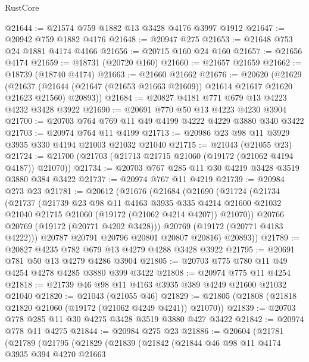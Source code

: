 \begin{lexlean}{RustCore}
\begin{coremodule}
@21644 := @21574 @759 @1882 @13 @3428 @4176 @3997 @1912
@21647 := @20942 @759 @1882 @4176
@21648 := @20947 @275
@21653 := @21648 @753 @24 @1881 @4174 @4166
@21656 := @20715 @160 @24 @160
@21657 := @21656 @4174
@21659 := @18731 (@20720 @160)
@21660 := @21657 @21659
@21662 := @18739 (@18740 @4174)
@21663 := @21660 @21662
@21676 := @20620
    (@21629
      (@21637 (@21644 (@21647 (@21653 @21663 @21609)) @21614 @21617 @21620 @21623 @21560) @20893))
@21684 := @20827 @4181 @771 @679 @13 @4223 @4232 @3428 @3922
@21690 := @20691 @770 @50 @13 @4223 @4230 @3904
@21700 := @20703 @764 @769 @11 @49 @4199 @4222 @4229 @3880 @340 @3422
@21703 := @20974 @764 @11 @4199
@21713 := @20986 @23 @98 @11 @3929 @3935 @330 @4194 @21003 @21032 @21040
@21715 := @21043 (@21055 @23)
@21724 := @21700 (@21703 (@21713 @21715 @21060 (@19172 (@21062 @4194 @4187)) @21070))
@21734 := @20703 @767 @285 @11 @30 @4219 @3428 @3519 @3880 @384 @3422
@21737 := @20974 @767 @11 @4219
@21739 := @20984 @273 @23
@21781 := @20612
    (@21676
      (@21684
        (@21690
          (@21724
            (@21734
              (@21737
                (@21739
                  @23
                  @98
                  @11
                  @4163
                  @3935
                  @335
                  @4214
                  @21600
                  @21032
                  @21040
                  @21715
                  @21060
                  (@19172 (@21062 @4214 @4207))
                  @21070))
              @20766
              @20769
              (@19172 (@20771 @4202 @3428)))
            @20769
            (@19172 (@20771 @4183 @4222)))
          @20787
          @20791
          @20796
          @20801
          @20807
          @20816)
        @20893))
@21789 := @20827 @4235 @782 @679 @13 @4279 @4288 @3428 @3922
@21795 := @20691 @781 @50 @13 @4279 @4286 @3904
@21805 := @20703 @775 @780 @11 @49 @4254 @4278 @4285 @3880 @399 @3422
@21808 := @20974 @775 @11 @4254
@21818 := @21739 @46 @98 @11 @4163 @3935 @389 @4249 @21600 @21032 @21040
@21820 := @21043 (@21055 @46)
@21829 := @21805 (@21808 (@21818 @21820 @21060 (@19172 (@21062 @4249 @4241)) @21070))
@21839 := @20703 @778 @285 @11 @30 @4275 @3428 @3519 @3880 @427 @3422
@21842 := @20974 @778 @11 @4275
@21844 := @20984 @275 @23
@21886 := @20604
    (@21781
      (@21789
        (@21795
          (@21829
            (@21839
              (@21842
                (@21844
                  @46
                  @98
                  @11
                  @4174
                  @3935
                  @394
                  @4270
                  @21663

\end{coremodule}
\end{lexlean}
